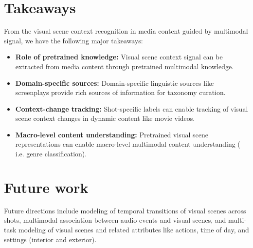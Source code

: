 \section{Takeaways}
From the visual scene context recognition in media content guided by multimodal signal, we have the following major takeaways:
\begin{itemize}
    \item \textbf{Role of pretrained knowledge:} Visual scene context signal can be extracted from media content through pretrained multimodal knowledge.
    \item \textbf{Domain-specific sources:} Domain-specific linguistic sources like screenplays provide rich sources of information for taxonomy curation.
    \item \textbf{Context-change tracking:} Shot-specific labels can enable tracking of visual scene context changes in dynamic content like movie videos.
    \item \textbf{Macro-level content understanding:} Pretrained visual scene representations can enable macro-level multimodal content understanding ( i.e. genre classification).
\end{itemize}
\section {Future work}
 Future directions include modeling of temporal transitions of visual scenes across shots, multimodal association between audio events and visual scenes, and multi-task modeling of visual scenes and related attributes like actions, time of day, and settings (interior and exterior).






